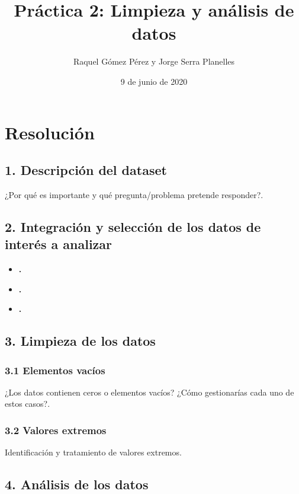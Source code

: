 \documentclass[12pt]{article}
\title{Práctica 2: Limpieza y análisis de datos}
\author{Raquel Gómez Pérez y Jorge Serra Planelles}
\date{9 de junio de 2020}
\providecommand{\tightlist}{%
  \setlength{\itemsep}{0pt}\setlength{\parskip}{0pt}}
\begin{document}
\maketitle

\hypertarget{resolucion}{%
\section{Resolución}\label{resolucion}}

\hypertarget{descripcion}{%
\subsection{1. Descripción del dataset}\label{descripcion}}
¿Por qué es importante y qué pregunta/problema pretende responder?.

	
\hypertarget{seleccion}{%
\subsection{2. Integración y selección de los datos de interés a analizar}\label{seleccion}}


\begin{itemize}
\tightlist
\item
  \textbf.\\  
\item
  \textbf.\\
\item
  \textbf.\\  
\end{itemize}

\newpage

\hypertarget{limpieza}{%
\subsection{3. Limpieza de los datos}\label{limpieza}} 

\hypertarget{ceros}{%
\subsubsection{3.1 Elementos vacíos}\label{ceros}}
¿Los datos contienen ceros o elementos vacíos? ¿Cómo gestionarías cada uno de estos casos?. 

\hypertarget{extremos}{%
\subsubsection{3.2 Valores extremos}\label{extremos}}
Identificación y tratamiento de valores extremos.
\hypertarget{analisis}{%
\subsection{4. Análisis de los datos}\label{analisis}}
\end{document}
